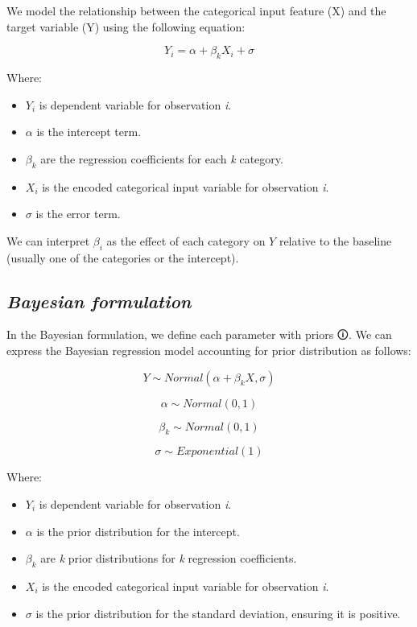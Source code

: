 \documentclass[
  letterpaper,
  DIV=11,
  numbers=noendperiod]{scrreprt}
\begin{document}
We model the relationship between the categorical input feature (X) and
the target variable (Y) using the following equation:

\[
Y_i = \alpha + \beta_k X_i + \sigma
\]

Where:

\begin{itemize}
\item
  \(Y_i\) is dependent variable for observation \emph{i}.
\item
  \(\alpha\) is the intercept term.
\item
  \(\beta_k\) are the regression coefficients for each \emph{k}
  category.
\item
  \(X_i\) is the encoded categorical input variable for observation
  \emph{i}.
\item
  \(\sigma\) is the error term.
\end{itemize}

We can interpret \(\beta_i\) as the effect of each category on \(Y\)
relative to the baseline (usually one of the categories or the
intercept).

\subsection{\texorpdfstring{\emph{Bayesian
formulation}}{Bayesian formulation}}\label{bayesian-formulation-3}

In the Bayesian formulation, we define each parameter with
\label{prior}{{priors 🛈}}. We can express the Bayesian
regression model accounting for prior distribution as follows:

\[
Y \sim Normal(\alpha +  \beta_k X, \sigma)
\]

\[
\alpha \sim Normal(0,1)
\]

\[
\beta_k \sim Normal(0,1)
\]

\[
\sigma \sim Exponential(1)
\]

Where:

\begin{itemize}
\item
  \(Y_i\) is dependent variable for observation \emph{i}.
\item
  \(\alpha\) is the prior distribution for the intercept.
\item
  \(\beta_k\) are \emph{k} prior distributions for \emph{k} regression
  coefficients.
\item
  \(X_i\) is the encoded categorical input variable for observation
  \emph{i}.
\item
  \(\sigma\) is the prior distribution for the standard deviation,
  ensuring it is positive.
\end{itemize}
\end{document}
